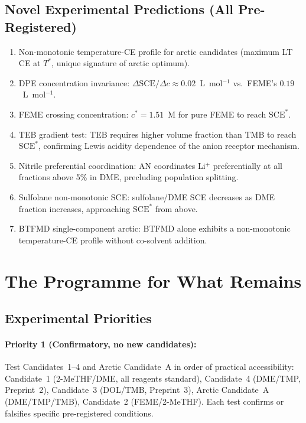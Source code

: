 \documentclass[11pt]{article}
\theoremstyle{plain}
\theoremstyle{definition}
\theoremstyle{remark}
\begin{document}
\subsection{Novel Experimental Predictions (All Pre-Registered)}

\begin{enumerate}[leftmargin=2em]
  \item Non-monotonic temperature-CE profile for arctic
        candidates (maximum LT CE at $T^{*}$, unique signature
        of arctic optimum).
  \item DPE concentration invariance: $\Delta\mathrm{SCE}/\Delta c
        \approx 0.02$~L~mol$^{-1}$ vs.\ FEME's $0.19$~L~mol$^{-1}$.
  \item FEME crossing concentration: $c^{*} = 1.51$~M for pure
        FEME to reach $\mathrm{SCE}^{*}$.
  \item TEB gradient test: TEB requires higher volume fraction
        than TMB to reach $\mathrm{SCE}^{*}$, confirming Lewis
        acidity dependence of the anion receptor mechanism.
  \item Nitrile preferential coordination: AN coordinates Li$^+$
        preferentially at all fractions above 5\% in DME,
        precluding population splitting.
  \item Sulfolane non-monotonic SCE: sulfolane/DME SCE
        decreases as DME fraction increases, approaching
        $\mathrm{SCE}^{*}$ from above.
  \item BTFMD single-component arctic: BTFMD alone exhibits
        a non-monotonic temperature-CE profile without
        co-solvent addition.
\end{enumerate}

\section{The Programme for What Remains}
\label{sec:programme}

\subsection{Experimental Priorities}

\paragraph{Priority 1 (Confirmatory, no new candidates):}
Test Candidates~1--4 and Arctic Candidate~A in order of
practical accessibility: Candidate~1 (2-MeTHF/DME, all
reagents standard), Candidate~4 (DME/TMP, Preprint~2),
Candidate~3 (DOL/TMB, Preprint~3), Arctic Candidate~A
(DME/TMP/TMB), Candidate~2 (FEME/2-MeTHF).  Each test
confirms or falsifies specific pre-registered conditions.
\end{document}
